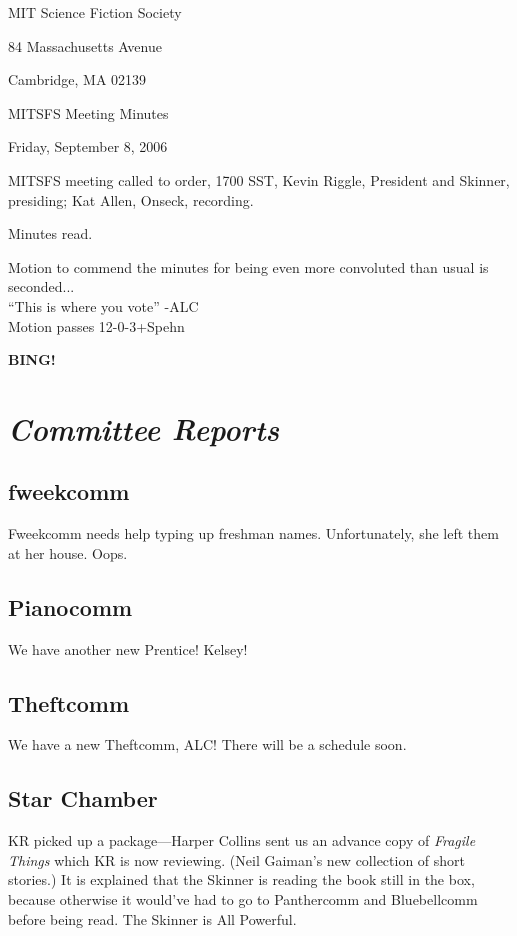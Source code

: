 \documentclass[10pt]{article}
\newcommand{\bing}{{\bf BING!} }
\newcommand{\goto}[1]{\bing \vskip 12pt \section*{{\em{#1}}}}
\begin{document}
\begin{center}

MIT Science Fiction Society

84 Massachusetts Avenue

Cambridge, MA 02139

\vspace{12pt}

MITSFS Meeting Minutes

Friday, September 8, 2006

\end{center}

\vspace{18pt}

\setlength{\parskip}{6pt}

\noindent
MITSFS meeting called to order, 1700 SST,
Kevin Riggle, President and Skinner, presiding; Kat Allen, Onseck, recording.

Minutes read.

Motion to commend the minutes for being even more convoluted than
usual is seconded...\\
``This is where you vote'' -ALC\\
Motion passes 12-0-3+Spehn

\goto{Committee Reports}
\subsection*{fweekcomm}
Fweekcomm needs help typing up freshman names. Unfortunately, she left
them at her house. Oops.

\subsection*{Pianocomm}
We have another new Prentice! Kelsey!
\subsection{Theftcomm}
We have a new Theftcomm, ALC!
There will be a schedule soon.

\subsection*{Star Chamber}
KR picked up a package---Harper Collins sent us an advance copy of
\emph{Fragile Things} which KR is now reviewing. (Neil Gaiman's new
collection of short stories.)  It is explained that the Skinner is
reading the book still in the box, because otherwise it would've had
to go to Panthercomm and Bluebellcomm before being read.  The Skinner
is All Powerful.
\end{document}
